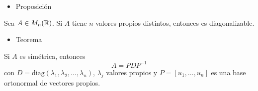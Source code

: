
\begin{itemize}[label=\color{red}\textbullet, leftmargin=*]
	\item \color{lightblue}Proposición
\end{itemize}
Sea $A\in M_n(\operatorname{\mathbb{R}})$. Si $A$ tiene $n$ valores propios distintos, entonces es diagonalizable.
\begin{itemize}[label=\color{red}\textbullet, leftmargin=*]
	\item \color{lightblue}Teorema
\end{itemize}
Si $A$ es simétrica, entonces \[ A=PDP^{-1} \]con $D=\mathrm{diag}(\lambda_1,\lambda_2,\dots,\lambda_n)$, $\lambda_j$ valores propios y $P=[u_1,\dots,u_n]$ es una base ortonormal de vectores propios.

